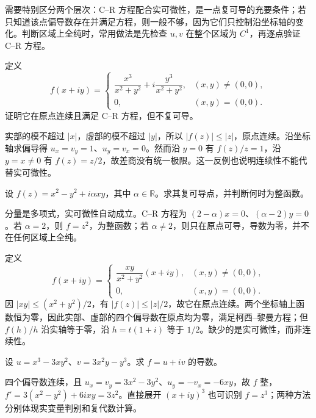 需要特别区分两个层次：C--R 方程配合实可微性，是一点复可导的充要条件；若只知道该点偏导数存在并满足方程，则一般不够，因为它们只控制沿坐标轴的变化。判断区域上全纯时，常用做法是先检查 $u,v$ 在整个区域为 $C^1$，再逐点验证 C--R 方程。

\begin{example}[只验证偏导数为什么不够]
定义
\[
 f(x+iy)=
 \begin{cases}
 \dfrac{x^3}{x^2+y^2}+i\dfrac{y^3}{x^2+y^2},&(x,y)\ne(0,0),\\
 0,&(x,y)=(0,0).
 \end{cases}
\]
证明它在原点连续且满足 C--R 方程，但不复可导。
\end{example}
\begin{solve}
实部的模不超过 $|x|$，虚部的模不超过 $|y|$，所以 $|f(z)|\le|z|$，原点连续。沿坐标轴求偏导得 $u_x=v_y=1$、$u_y=v_x=0$。然而沿 $y=0$ 有 $f(z)/z=1$，沿 $y=x\ne0$ 有 $f(z)=z/2$，故差商没有统一极限。这一反例也说明连续性不能代替实可微性。
\end{solve}

\begin{example}[判断一个函数在哪里全纯]
设 $f(z)=x^2-y^2+i\alpha xy$，其中 $\alpha\in\mathbb R$。求其复可导点，并判断何时为整函数。
\end{example}
\begin{solve}
分量是多项式，实可微性自动成立。C--R 方程为 $(2-\alpha)x=0$、$(\alpha-2)y=0$。若 $\alpha=2$，则 $f=z^2$，为整函数；若 $\alpha\ne2$，则只在原点可导，导数为零，并不在任何区域上全纯。
\end{solve}

\begin{example}[仅有偏导数的反例]
定义
\[
 f(x+iy)=\begin{cases}
 \dfrac{xy}{x^2+y^2}(x+iy),&(x,y)\ne(0,0),\\
 0,&(x,y)=(0,0).
 \end{cases}
\]
因 $|xy|\le(x^2+y^2)/2$，有 $|f(z)|\le|z|/2$，故它在原点连续。两个坐标轴上函数恒为零，因此实部、虚部的四个偏导数在原点均为零，满足柯西--黎曼方程；但 $f(h)/h$ 沿实轴等于零，沿 $h=t(1+i)$ 等于 $1/2$。缺少的是实可微性，而非连续性。
\end{example}

\begin{example}[识别一个整函数]
设 $u=x^3-3xy^2$、$v=3x^2y-y^3$。求 $f=u+iv$ 的导数。
\end{example}
\begin{solve}
四个偏导数连续，且 $u_x=v_y=3x^2-3y^2$、$u_y=-v_x=-6xy$，故 $f$ 整，$f'=3(x^2-y^2)+6ixy=3z^2$。直接展开 $(x+iy)^3$ 也可识别 $f=z^3$；两种方法分别体现实变量判别和复代数计算。
\end{solve}

